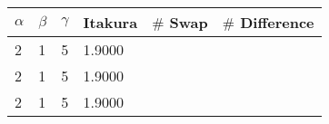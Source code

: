\begin{table}[htbp]
	\begin{center}
		\begin{tabular}{llllll}
			\toprule
			\multicolumn{1}{c}{$\alpha$} & \multicolumn{1}{c}{$\beta$} & \multicolumn{1}{c}{$\gamma$} & \multicolumn{1}{c}{Itakura}  & \multicolumn{1}{c}{$\#$ Swap} & \multicolumn{1}{c}{$\#$ Difference}\\
			\midrule
			2 & 1 & 5 & 1.9000 & & \\
			2 & 1 & 5 & 1.9000 & & \\
			2 & 1 & 5 & 1.9000 & & \\			
			\bottomrule			
		\end{tabular}		
	\end{center}
\label{tab:local_constraints_II}	
\end{table}
